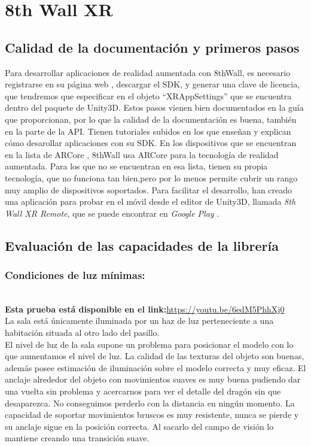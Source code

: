 \section{8th Wall XR}
\subsection{Calidad de la documentación y primeros pasos}
Para desarrollar aplicaciones de realidad aumentada con 8thWall, es necesario registrarse en su página web \cite{8thWall}, descargar el SDK, y generar una clave de licencia, que tendremos que especificar en el objeto ``XRAppSettings'' que se encuentra dentro del paquete de Unity3D. Estos pasos vienen bien documentados en la guía que proporcionan, por lo que la calidad de la documentación es buena, también en la parte de la API. Tienen tutoriales subidos en los que enseñan y explican cómo desarollar aplicaciones con su SDK. En los dispositivos que se encuentran en la lista de ARCore \cite{ARCoreList}, 8thWall usa ARCore para la tecnología de realidad aumentada. Para los que no se encuentran en esa lista, tienen su propia tecnología, que no funciona tan bien,pero por lo menos permite cubrir un rango muy amplio de dispositivos soportados. Para facilitar el desarrollo, han creado una aplicación para probar en el móvil desde el editor de Unity3D, llamada \textit{8th Wall XR Remote}, que se puede encontrar en \textit{Google Play} \cite{8thWallRemote}.
\subsection{Evaluación de las capacidades de la librería}
\subsubsection{Condiciones de luz mínimas:}\\
\textbf{Esta prueba está disponible en el link:}\url{https://youtu.be/6edM5PhhXj0}\\
La sala está únicamente iluminada por un haz de luz perteneciente a una habitación situada al otro lado del pasillo.\\

El nivel de luz de la sala supone un problema para posicionar el modelo con lo que aumentamos el nivel de luz. La calidad de las texturas del objeto son buenas, además posee estimación de iluminación sobre el modelo correcta y muy eficaz. El anclaje alrededor del objeto con movimientos suaves es muy buena pudiendo dar una vuelta sin problema y acercarnos para ver el detalle del dragón sin que desaparezca. No conseguimos perderlo con la distancia en ningún momento. La capacidad de soportar movimientos bruscos es muy resistente, nunca se pierde y su anclaje sigue en la posición correcta. Al sacarlo del campo de visión lo mantiene creando una transición suave. 

